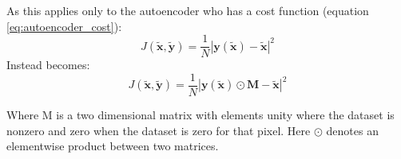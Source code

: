       As this applies only to the autoencoder who has a cost function (equation \ref{eq:autoencoder_cost}):
      \begin{equation}
          J(\tilde{\mathbf{x}},\tilde{\mathbf{y}})
          = \frac{1}{N}\left |\mathbf{y}(\tilde{\mathbf{x}})-\tilde{\mathbf{x}}\right | ^2
      \end{equation}
      Instead becomes:
      \begin{equation}
          J(\tilde{\mathbf{x}},\tilde{\mathbf{y}})
          = \frac{1}{N}\left |\mathbf{y}(\tilde{\mathbf{x}}) \odot \mathbf{M}-\tilde{\mathbf{x}}\right | ^2
      \end{equation}

      Where M is a two dimensional matrix with elements unity where the dataset is nonzero
      and zero when the dataset is zero for that pixel. Here $\odot$ denotes an elementwise
      product between two matrices.
